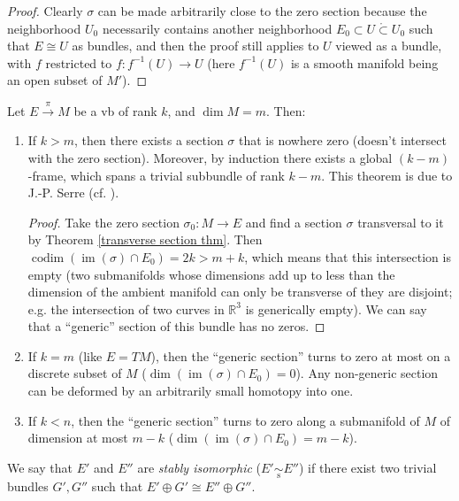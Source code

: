 \documentclass[english,letterpaper]{article}%
\numberwithin{equation}{section}
\numberwithin{figure}{section}
\numberwithin{table}{section}
\theoremstyle{definition}
\theoremstyle{definition}
\theoremstyle{definition}
\theoremstyle{plain}
\theoremstyle{plain}
\theoremstyle{plain}
\theoremstyle{plain}
\theoremstyle{remark}
\theoremstyle{remark}
\DeclareMathOperator{\im}{im}
\DeclareMathOperator{\codim}{codim}
\begin{document}
\begin{proof}
Clearly $\sigma$ can be made arbitrarily close to the zero section because the neighborhood $U_0$ necessarily contains another neighborhood $E_0\subset U\mathring{\subset} U_0$ such that $E\cong U$ as bundles, and then the proof still applies to $U$ viewed as a bundle, with $f$ restricted to $f:f^{-1}(U)\to U$ (here $f^{-1}(U)$ is a smooth manifold being an open subset of $M'$).
\end{proof}

\begin{cor}
Let $E\overset{\pi}{\to} M$ be a \gls{vb} of rank $k$, and $\dim M=m$. Then:
\begin{enumerate}
    \item If $k>m$, then there exists a section $\sigma$ that is nowhere zero (doesn't intersect with the zero section). Moreover, by induction there exists a global $(k-m)$-frame, which spans a trivial subbundle of rank $k-m$. This theorem is due to J.-P. Serre (cf. \cite[Thm. 2]{Atiyah}).
    \begin{proof}
    Take the zero section $\sigma_0:M\to E$ and find a section $\sigma$ transversal to it by Theorem \ref{transverse section thm}. Then $\codim(\im (\sigma)\cap E_0)=2k>m+k$, which means that this intersection is empty (two submanifolds whose dimensions add up to less than the dimension of the ambient manifold can only be transverse of they are disjoint; e.g. the intersection of two curves in $\mathbb{R}^3$ is generically empty). We can say that a ``generic'' section of this bundle has no zeros.
    \end{proof}
    \item If $k=m$ (like $E=TM$), then the ``generic section'' turns to zero at most on a discrete subset of $M$ ($\dim(\im(\sigma)\cap E_0)=0$). Any non-generic section can be deformed by an arbitrarily small homotopy into one.
    \item If $k<n$, then the ``generic section'' turns to zero along a submanifold of $M$ of dimension at most $m-k$ ($\dim(\im(\sigma)\cap E_0)=m-k$). 
\end{enumerate}
\end{cor}

\begin{defn}
We say that $E'$ and $E''$ are \emph{stably isomorphic} ($E'\underset{\mathrm{s}}{\sim}E''$) if there exist two trivial bundles $G',G''$ such that $E'\oplus G'\cong E''\oplus G''$. 
\end{defn}
\end{document}
